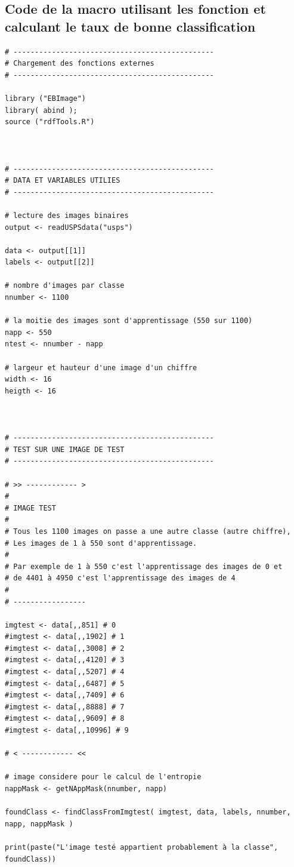 \documentclass[a4paper,11pt]{article}
\begin{document}
  \subsection{Code de la macro utilisant les fonction et calculant le taux de bonne classification}
  \begin{lstlisting}[caption=Macro testant les images de test]
# -----------------------------------------------
# Chargement des fonctions externes
# -----------------------------------------------

library ("EBImage")
library( abind );
source ("rdfTools.R")



# -----------------------------------------------
# DATA ET VARIABLES UTILIES
# -----------------------------------------------

# lecture des images binaires
output <- readUSPSdata("usps")

data <- output[[1]]
labels <- output[[2]]

# nombre d'images par classe
nnumber <- 1100

# la moitie des images sont d'apprentissage (550 sur 1100)
napp <- 550
ntest <- nnumber - napp

# largeur et hauteur d'une image d'un chiffre
width <- 16
heigth <- 16



# -----------------------------------------------
# TEST SUR UNE IMAGE DE TEST
# -----------------------------------------------

# >> ------------ >
#
# IMAGE TEST
#
# Tous les 1100 images on passe a une autre classe (autre chiffre),
# Les images de 1 à 550 sont d'apprentissage.
#
# Par exemple de 1 à 550 c'est l'apprentissage des images de 0 et 
# de 4401 à 4950 c'est l'apprentissage des images de 4
#
# -----------------

imgtest <- data[,,851] # 0
#imgtest <- data[,,1902] # 1
#imgtest <- data[,,3008] # 2
#imgtest <- data[,,4120] # 3
#imgtest <- data[,,5207] # 4
#imgtest <- data[,,6487] # 5
#imgtest <- data[,,7409] # 6
#imgtest <- data[,,8888] # 7
#imgtest <- data[,,9609] # 8
#imgtest <- data[,,10996] # 9

# < ------------ <<

# image considere pour le calcul de l'entropie
nappMask <- getNAppMask(nnumber, napp)

foundClass <- findClassFromImgtest( imgtest, data, labels, nnumber, napp, nappMask )

print(paste("L'image testé appartient probablement à la classe", foundClass))




\end{lstlisting}
\end{document}
